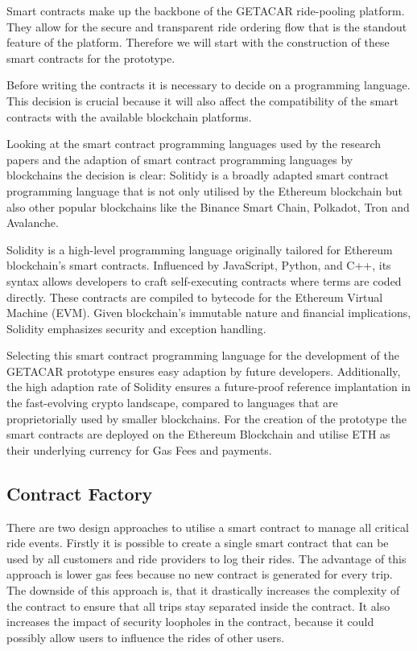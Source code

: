 Smart contracts make up the backbone of the GETACAR ride-pooling platform. They allow for the secure and transparent ride ordering flow that is the standout feature of the platform. Therefore we will start with the construction of these smart contracts for the prototype. 

Before writing the contracts it is necessary to decide on a programming language. This decision is crucial because it will also affect the compatibility of the smart contracts with the available blockchain platforms. 

Looking at the smart contract programming languages used by the research papers and the adaption of smart contract programming languages by blockchains the decision is clear: Solitidy is a broadly adapted smart contract programming language that is not only utilised by the Ethereum blockchain but also other popular blockchains like the Binance Smart Chain, Polkadot, Tron and Avalanche. 

Solidity is a high-level programming language originally tailored for Ethereum blockchain's smart contracts. Influenced by JavaScript, Python, and C++, its syntax allows developers to craft self-executing contracts where terms are coded directly. These contracts are compiled to bytecode for the Ethereum Virtual Machine (EVM). Given blockchain's immutable nature and financial implications, Solidity emphasizes security and exception handling. 

Selecting this smart contract programming language for the development of the GETACAR prototype ensures easy adaption by future developers. Additionally, the high adaption rate of Solidity ensures a future-proof reference implantation in the fast-evolving crypto landscape, compared to languages that are proprietorially used by smaller blockchains. For the creation of the prototype the smart contracts are deployed on the Ethereum Blockchain and utilise ETH as their underlying currency for Gas Fees and payments.

\subsection{Contract Factory}
There are two design approaches to utilise a smart contract to manage all critical ride events. Firstly it is possible to create a single smart contract that can be used by all customers and ride providers to log their rides. The advantage of this approach is lower gas fees because no new contract is generated for every trip. The downside of this approach is, that it drastically increases the complexity of the contract to ensure that all trips stay separated inside the contract. It also increases the impact of security loopholes in the contract, because it could possibly allow users to influence the rides of other users. 


